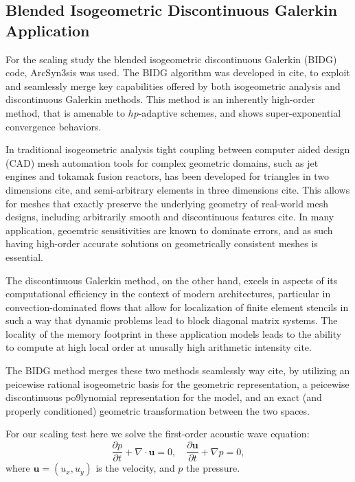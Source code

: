\subsection{Blended Isogeometric Discontinuous Galerkin Application}
\label{sec:isogeometric}

For the scaling study the blended isogeometric discontinuous Galerkin (BIDG) code, ArcSyn3sis was used.  The BIDG algorithm was developed in cite, to exploit and seamlessly merge key capabilities offered by both isogeometric analysis and discontinuous Galerkin methods. This method is an inherently high-order method, that is amenable to $hp$-adaptive schemes, and shows super-exponential convergence behaviors.

In traditional isogeometric analysis tight coupling between computer aided design (CAD) mesh automation tools for complex geometric domains, such as jet engines and tokamak fusion reactors, has been developed for triangles in two dimensions cite, and semi-arbitrary elements in three dimensions cite.    This allows for meshes that exactly preserve the underlying geometry of real-world mesh designs, including arbitrarily smooth and discontinuous features cite.  In many application, geoemtric sensitivities are known to dominate errors, and as such having high-order accurate solutions on geometrically consistent meshes is essential.

The discontinuous Galerkin method, on the other hand, excels in aspects of its computational efficiency in the context of modern architectures, particular in convection-dominated flows that allow for localization of finite element stencils in such a way that dynamic problems lead to block diagonal matrix systems.  The locality of the memory footprint in these application models leads to the ability to compute at high local order at unusally high arithmetic intensity cite.

The BIDG method merges these two methods seamlessly way cite, by utilizing an peicewise rational isogeometric basis for the geometric representation, a peicewise discontinuous po9lynomial representation for the model, and an exact (and properly conditioned) geometric transformation between the two spaces.

For our scaling test here we solve the first-order acoustic wave equation: \begin{equation} \label{awe} \frac{\partial p}{\partial t} + \nabla\cdot \boldsymbol{u} = 0, \quad  \frac{\partial\boldsymbol{u}}{\partial t} + \nabla p = 0, \end{equation} where $\boldsymbol{u}=(u_x,u_y)$ is the velocity, and $p$ the pressure.

